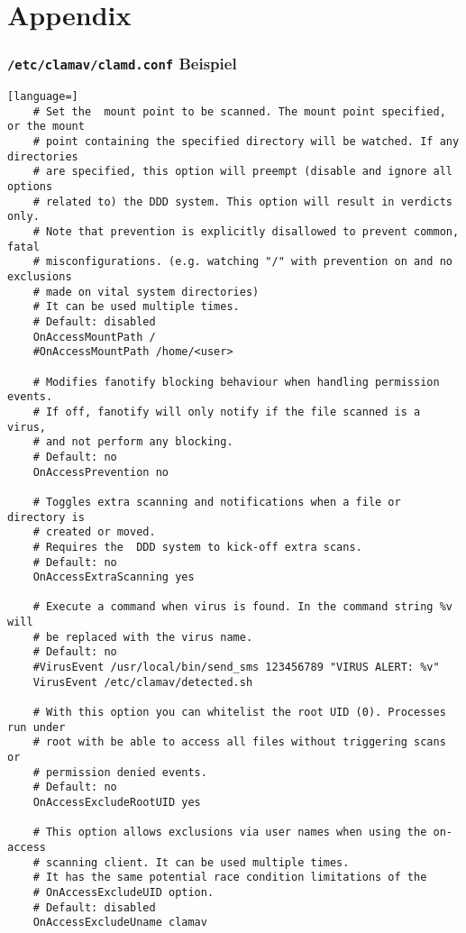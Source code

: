 \appendix
{}
\part*{\textsf{Appendix}}
\section{\texttt{/etc/clamav/clamd.conf} Beispiel}\label{app:clamd.conf}
\begin{lstlisting}[language=]	
	# Set the  mount point to be scanned. The mount point specified, or the mount
	# point containing the specified directory will be watched. If any directories
	# are specified, this option will preempt (disable and ignore all options
	# related to) the DDD system. This option will result in verdicts only.
	# Note that prevention is explicitly disallowed to prevent common, fatal
	# misconfigurations. (e.g. watching "/" with prevention on and no exclusions
	# made on vital system directories)
	# It can be used multiple times.
	# Default: disabled
	OnAccessMountPath /
	#OnAccessMountPath /home/<user>
	
	# Modifies fanotify blocking behaviour when handling permission events.    
	# If off, fanotify will only notify if the file scanned is a virus,    
	# and not perform any blocking.    
	# Default: no    
	OnAccessPrevention no 
	
	# Toggles extra scanning and notifications when a file or directory is    
	# created or moved.    
	# Requires the  DDD system to kick-off extra scans.    
	# Default: no    
	OnAccessExtraScanning yes
	
	# Execute a command when virus is found. In the command string %v will
	# be replaced with the virus name.                                      
	# Default: no
	#VirusEvent /usr/local/bin/send_sms 123456789 "VIRUS ALERT: %v"                
	VirusEvent /etc/clamav/detected.sh 
	
	# With this option you can whitelist the root UID (0). Processes run under
	# root with be able to access all files without triggering scans or
	# permission denied events.
	# Default: no
	OnAccessExcludeRootUID yes 
	
	# This option allows exclusions via user names when using the on-access
	# scanning client. It can be used multiple times.
	# It has the same potential race condition limitations of the
	# OnAccessExcludeUID option.
	# Default: disabled
	OnAccessExcludeUname clamav
\end{lstlisting}

